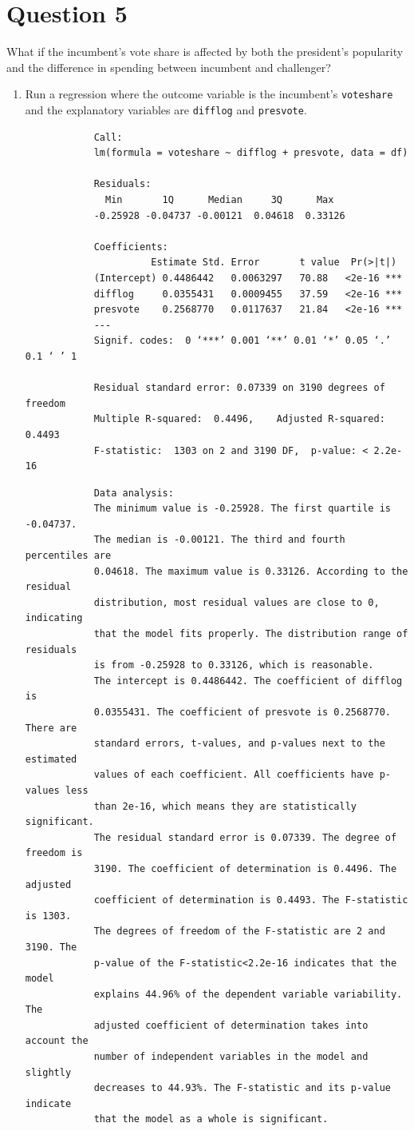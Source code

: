\documentclass[12pt,letterpaper]{article}
\begin{document}
\section*{Question 5}
\noindent What if the incumbent's vote share is affected by both the president's popularity and the difference in spending between incumbent and challenger? 
	\begin{enumerate}
		\item Run a regression where the outcome variable is the incumbent's \texttt{voteshare} and the explanatory variables are \texttt{difflog} and \texttt{presvote}.	
		
		\begin{verbatim}
			Call:
			lm(formula = voteshare ~ difflog + presvote, data = df)
			
			Residuals:
			  Min       1Q      Median     3Q      Max 
			-0.25928 -0.04737 -0.00121  0.04618  0.33126 
			
			Coefficients:
			          Estimate Std. Error       t value  Pr(>|t|)    
			(Intercept) 0.4486442   0.0063297   70.88   <2e-16 ***
			difflog     0.0355431   0.0009455   37.59   <2e-16 ***
			presvote    0.2568770   0.0117637   21.84   <2e-16 ***
			---
			Signif. codes:  0 ‘***’ 0.001 ‘**’ 0.01 ‘*’ 0.05 ‘.’ 0.1 ‘ ’ 1
			
			Residual standard error: 0.07339 on 3190 degrees of freedom
			Multiple R-squared:  0.4496,	Adjusted R-squared:  0.4493 
			F-statistic:  1303 on 2 and 3190 DF,  p-value: < 2.2e-16
		\end{verbatim}
		\begin{verbatim}
			Data analysis:
			The minimum value is -0.25928. The first quartile is -0.04737. 
			The median is -0.00121. The third and fourth percentiles are 
			0.04618. The maximum value is 0.33126. According to the residual 
			distribution, most residual values are close to 0, indicating 
			that the model fits properly. The distribution range of residuals 
			is from -0.25928 to 0.33126, which is reasonable.
			The intercept is 0.4486442. The coefficient of difflog is 
			0.0355431. The coefficient of presvote is 0.2568770. There are 
			standard errors, t-values, and p-values next to the estimated 
			values of each coefficient. All coefficients have p-values less 
			than 2e-16, which means they are statistically significant.
			The residual standard error is 0.07339. The degree of freedom is 
			3190. The coefficient of determination is 0.4496. The adjusted 
			coefficient of determination is 0.4493. The F-statistic is 1303. 
			The degrees of freedom of the F-statistic are 2 and 3190. The 
			p-value of the F-statistic<2.2e-16 indicates that the model 
			explains 44.96% of the dependent variable variability. The 
			adjusted coefficient of determination takes into account the 
			number of independent variables in the model and slightly 
			decreases to 44.93%. The F-statistic and its p-value indicate 
			that the model as a whole is significant.
			

\end{verbatim}
\end{enumerate}
\end{document}
